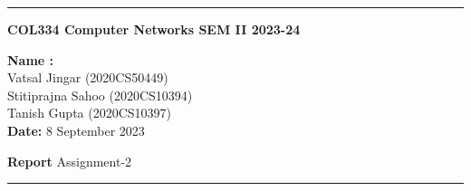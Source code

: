 \documentclass[12pt]{scrartcl}
\begin{document}
\newcommand{\current}{June 2023}
\begin{center}
\hrule
\vspace{.4cm}
{\textbf { \large COL334 Computer Networks SEM II 2023-24}}
\end{center}
{
\textbf{Name :}\  \\Vatsal Jingar (2020CS50449)\\ Stitiprajna Sahoo (2020CS10394)\\ Tanish Gupta (2020CS10397)\\ \hspace{\fill} \textbf{Date:} 8 September 2023  \
{ \hspace{\fill} \textbf{Report } Assignment-2 \
\hrule
}
}
\subject{Implementation}
\end{document}
